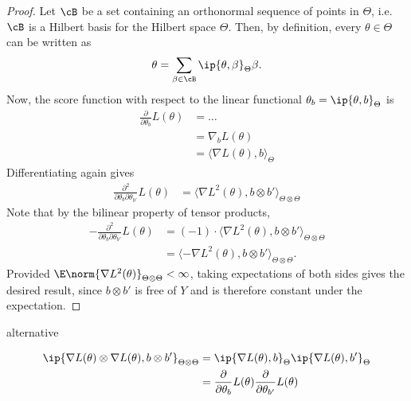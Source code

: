 \begin{proof}
  Let $\cB$ be a set containing an orthonormal sequence of points in $\Theta$, i.e. $\cB$ is a Hilbert basis for the Hilbert space $\Theta$. 
  Then, by definition, every $\theta \in \Theta$ can be written as
  \[
    \theta = \sum_{\beta \in \cB} \ip{\theta,\beta}_\Theta \beta.
  \]
  Now, the score function with respect to the linear functional $\theta_b = \ip{\theta,b}_\Theta$ is
  \begin{align*}
    \frac{\partial}{\partial\theta_b} L(\theta) 
    &= \dots \\
    &= \nabla_b L(\theta) \\
    &= \langle \nabla L(\theta), b \rangle_{\Theta}
  \end{align*}
  Differentiating again gives
  \begin{align*}
    \frac{\partial^2}{\partial\theta_b\partial\theta_{b'}} L(\theta) 
    &= \langle \nabla L^2(\theta), b \otimes b' \rangle_{\Theta \otimes \Theta}
  \end{align*}  
  Note that by the bilinear property of tensor products,
    \begin{align*}
    -\frac{\partial^2}{\partial\theta_b\partial\theta_{b'}} L(\theta)
    &= (-1) \cdot \langle \nabla L^2(\theta), b \otimes b' \rangle_{\Theta \otimes \Theta} \\
    &= \langle -\nabla L^2(\theta), b \otimes b' \rangle_{\Theta \otimes \Theta}.
  \end{align*}  
  Provided $\E \norm{\nabla L^2(\theta)}_{\Theta \otimes \Theta} < \infty$, taking expectations of both sides gives the desired result, since $b\otimes b'$ is free of $Y$ and is therefore constant under the expectation. 
\end{proof}

alternative

\begin{align*}
  \ip{\nabla L(\theta) \otimes \nabla L(\theta), b \otimes b'}_{\Theta \otimes \Theta} 
  &= \ip{\nabla L(\theta), b }_\Theta  \ip{\nabla L(\theta), b' }_\Theta \\
  &= \frac{\partial}{\partial\theta_b} L(\theta)\frac{\partial}{\partial\theta_{b'}} L(\theta)
\end{align*}
